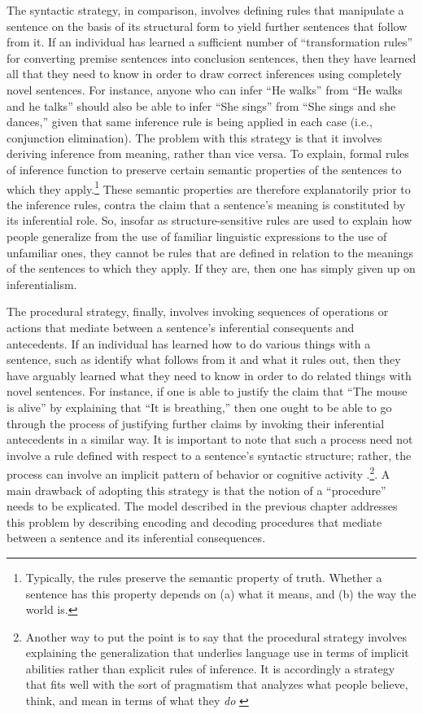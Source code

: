 The syntactic strategy, in comparison, involves defining rules that manipulate a sentence on the basis of its structural form to yield further sentences that follow from it. If an individual has learned a sufficient number of ``transformation rules'' for converting premise sentences into conclusion sentences, then they have learned all that they need to know in order to draw correct inferences using completely novel sentences. For instance, anyone who can infer ``He walks'' from ``He walks and he talks'' should also be able to infer ``She sings'' from ``She sings and she dances,'' given that same inference rule is being applied in each case (i.e., conjunction elimination). The problem with this strategy is that it involves deriving inference from meaning, rather than vice versa. To explain, formal rules of inference function to preserve certain semantic properties of the sentences to which they apply.\footnote{Typically, the rules preserve the semantic property of truth. Whether a sentence has this property depends on (a) what it means, and (b) the way the world is.} These semantic properties are therefore explanatorily prior to the inference rules, contra the claim that a sentence's meaning is constituted by its inferential role. So, insofar as structure-sensitive rules are used to explain how people generalize from the use of familiar linguistic expressions to the use of unfamiliar ones, they cannot be rules that are defined in relation to the meanings of the sentences to which they apply. If they are, then one has simply given up on inferentialism. 

The procedural strategy, finally, involves invoking sequences of operations or actions that mediate between a sentence's inferential consequents and antecedents. If an individual has learned how to do various things with a sentence, such as identify what follows from it and what it rules out, then they have arguably learned what they need to know in order to do related things with novel sentences. For instance, if one is able to justify the claim that ``The mouse is alive'' by explaining that ``It is breathing,'' then one ought to be able to go through the process of justifying further claims by invoking their inferential antecedents in a similar way. It is important to note that such a process need not involve a rule defined with respect to a sentence's syntactic structure; rather, the process can involve an implicit pattern of behavior or cognitive activity \citep{Brandom:1994}.\footnote{Another way to put the point is to say that the procedural strategy involves explaining the generalization that underlies language use in terms of implicit abilities rather than explicit rules of inference. It is accordingly a strategy that fits well with the sort of pragmatism that analyzes what people believe, think, and mean in terms of what they \textit{do} \citep{Brandom:2011,Brandom:1994,Misak:2007,Misak:2013}}. A main drawback of adopting this strategy is that the notion of a ``procedure'' needs to be explicated. The model described in the previous chapter addresses this problem by describing encoding and decoding procedures that mediate between a sentence and its inferential consequences. 

